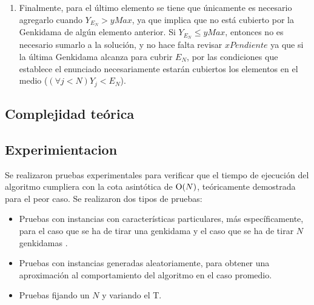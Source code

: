 \begin{enumerate}
{\begin{enumerate}
{\begin{enumerate}
\begin{enumerate}
						\end{enumerate}
					\end{enumerate}
					}
				\end{enumerate}
		}
		\item{
			Finalmente, para el último elemento se tiene que únicamente
			es necesario agregarlo cuando $Y_{E_N} > yMax$, ya que
			implica que no está cubierto por la Genkidama de algún
			elemento anterior. Si $Y_{E_N} \leq yMax$, entonces no es
			necesario sumarlo a la solución, y no hace falta revisar
			$xPendiente$ ya que si la última Genkidama alcanza para
			cubrir $E_N$, por las condiciones que establece el
			enunciado necesariamente estarán cubiertos los elementos en
			el medio ($(\forall j < N) Y_j < E_N$).}

	\end{enumerate}

    \subsection{Complejidad teórica}
         
       


    \subsection{Experimientacion}
         

	Se realizaron pruebas experimentales para verificar que el tiempo de ejecución del algoritmo cumpliera con la cota asintótica de $\operatorname{O}(N)$, teóricamente demostrada para el peor caso. Se realizaron dos tipos de pruebas:
        
        \begin{itemize}
            \item Pruebas con instancias con características particulares, más específicamente, para el caso que se ha de tirar una genkidama y el caso que se ha de tirar $N$ genkidamas .
            \item Pruebas con instancias generadas aleatoriamente, para obtener una aproximación al comportamiento del algoritmo en el caso promedio.
            \item Pruebas fijando un $N$ y variando el T. 
        \end{itemize}

